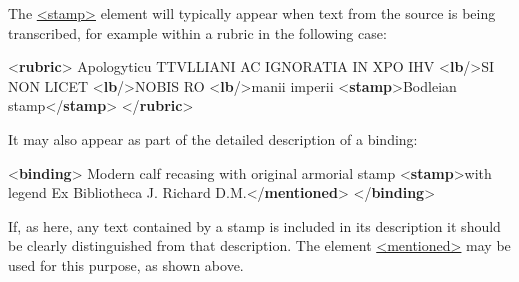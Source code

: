 The \hyperref[TEI.stamp]{<stamp>} element will typically appear when text from the source is being transcribed, for example within a rubric in the following case: \par\bgroup{}\exampleFont \begin{shaded}\noindent\mbox{}{<\textbf{rubric}>}\mbox{}\newline 
{}Apologyticu TTVLLIANI AC IGNORATIA IN XPO IHV\mbox{}\newline 
{<\textbf{lb}/>}SI NON LICET\mbox{}\newline 
{<\textbf{lb}/>}NOBIS RO\mbox{}\newline 
{<\textbf{lb}/>}manii imperii {<\textbf{stamp}>}Bodleian stamp{</\textbf{stamp}>}\mbox{}\newline 
{}\mbox{}\newline 
{</\textbf{rubric}>}\end{shaded}\egroup\par \par
It may also appear as part of the detailed description of a binding: \par\bgroup{}\exampleFont \begin{shaded}\noindent\mbox{}{<\textbf{binding}>}\mbox{}\newline 
{}Modern calf recasing with original armorial stamp {<\textbf{stamp}>}with legend\mbox{}\newline 
\hspace*{1em}Ex Bibliotheca J. Richard\mbox{}\newline 
\hspace*{1em}\hspace*{1em}\hspace*{1em}\hspace*{1em}\hspace*{1em}\hspace*{1em} D.M.{</\textbf{mentioned}>}\mbox{}\newline 
\hspace*{1em}\mbox{}\newline 
{}\mbox{}\newline 
{</\textbf{binding}>}\end{shaded}\egroup\par \par
If, as here, any text contained by a stamp is included in its description it should be clearly distinguished from that description. The element \hyperref[TEI.mentioned]{<mentioned>} may be used for this purpose, as shown above.
